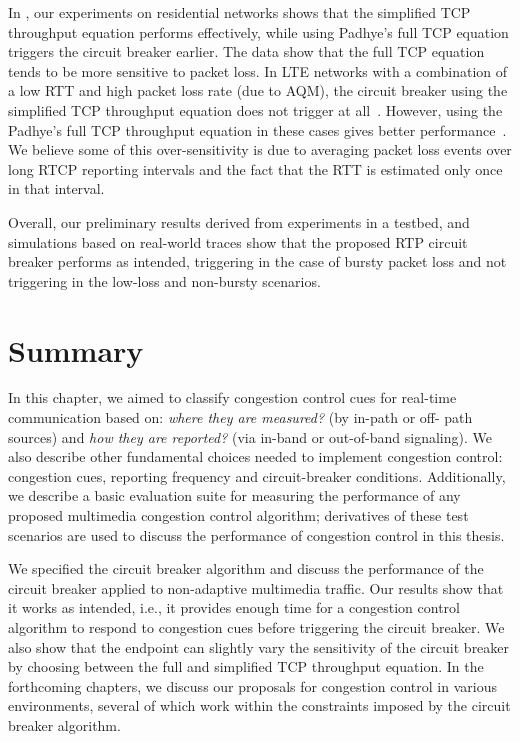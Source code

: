 In , our experiments on residential networks shows that the
simplified TCP throughput equation performs effectively, while using Padhye's
full TCP equation triggers the circuit breaker earlier. The data show that
the full TCP equation tends to be more sensitive to packet loss. In LTE
networks with a combination of a low RTT and high packet loss rate (due to
AQM), the circuit breaker using the simplified TCP throughput equation
does not trigger at all~\cite{Sarker:CB.lte}. However, using the Padhye's full TCP
throughput equation in these cases gives better
performance~\cite{Sarker:CB.lte}. We believe some of this over-sensitivity is
due to averaging packet loss events over long RTCP reporting intervals and the
fact that the RTT is estimated only once in that interval.

Overall, our preliminary results derived from experiments in a testbed,
and simulations based on real-world traces show that
the proposed RTP circuit breaker performs as intended, triggering in the case
of bursty  packet loss and  not triggering in the low-loss and non-bursty
scenarios. 



\section{Summary}

In this chapter, we aimed to classify congestion control cues for real-time
communication based on: \emph{where they are measured?} (by in-path or  off-
path sources) and \emph{how they are reported?} (via in-band or out-of-band
signaling). We also describe other fundamental choices needed to implement
congestion control: congestion cues, reporting frequency and  circuit-breaker
conditions. Additionally, we describe a basic evaluation suite for measuring
the performance of any proposed multimedia congestion control algorithm;
derivatives of these test scenarios are used to discuss the performance of
congestion control in this thesis.

We specified the circuit breaker algorithm and discuss the performance of the
circuit breaker applied to non-adaptive multimedia traffic. Our results show
that it works as intended, i.e., it provides enough time for a congestion
control algorithm to respond to congestion cues before triggering the circuit
breaker. We also show that the endpoint can slightly vary the sensitivity of
the circuit breaker by choosing between the full and simplified TCP throughput
equation. In the forthcoming chapters, we discuss our proposals for congestion
control in various environments, several of which work within the constraints
imposed by the circuit breaker algorithm.


